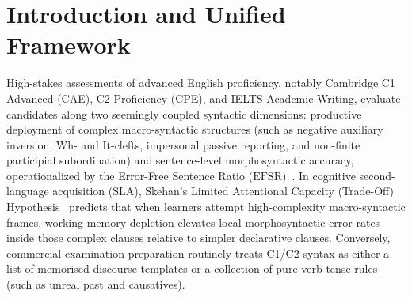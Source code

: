 \documentclass[11pt,reqno]{article}
\begin{document}
\section{Introduction and Unified Framework}

High-stakes assessments of advanced English proficiency, notably Cambridge C1 Advanced (CAE), C2 Proficiency (CPE), and IELTS Academic Writing, evaluate candidates along two seemingly coupled syntactic dimensions: productive deployment of complex macro-syntactic structures (such as negative auxiliary inversion, Wh- and It-clefts, impersonal passive reporting, and non-finite participial subordination) and sentence-level morphosyntactic accuracy, operationalized by the Error-Free Sentence Ratio ($\mathrm{EFSR}$)~\cite{Hawkins2012,Housen2012}. In cognitive second-language acquisition (SLA), Skehan's Limited Attentional Capacity (Trade-Off) Hypothesis~\cite{Skehan1998} predicts that when learners attempt high-complexity macro-syntactic frames, working-memory depletion elevates local morphosyntactic error rates inside those complex clauses relative to simpler declarative clauses. Conversely, commercial examination preparation routinely treats C1/C2 syntax as either a list of memorised discourse templates or a collection of pure verb-tense rules (such as unreal past and causatives).
\end{document}
